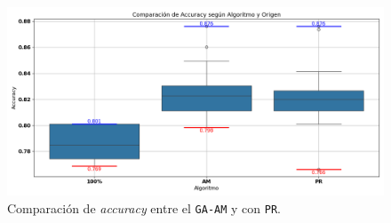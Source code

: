 \begin{figure}[htp]
    \centering
    \includegraphics[width=1\textwidth]{imagenes/evaluaciones/reinicio-poblacional}
    \caption{Comparación de \textit{accuracy} entre el \texttt{GA-AM} y con \texttt{PR}.}
    \label{fig:reinicio_poblacional}
\end{figure}
